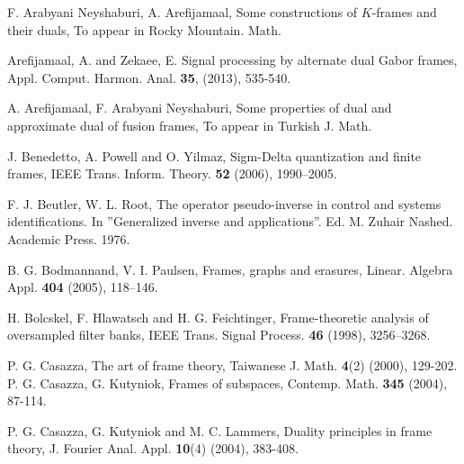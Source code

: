 \documentclass{birkjour}
\theoremstyle{definition}
\theoremstyle{remark}
\numberwithin{equation}{section}
\begin{document}






\begin{thebibliography}{10}


 F. Arabyani Neyshaburi, A. Arefijamaal, Some constructions of $K$-frames and their duals, To appear in Rocky Mountain. Math.





Arefijamaal, A. and   Zekaee, E. Signal processing by alternate dual Gabor
frames, Appl. Comput. Harmon. Anal. {\bf 35}, (2013), 535-540.

 A. Arefijamaal, F. Arabyani Neyshaburi, Some properties of  dual and approximate dual of fusion frames, To appear in Turkish J. Math.

 J. Benedetto, A.  Powell  and  O. Yilmaz,   Sigm-Delta quantization and finite frames,  IEEE Trans. Inform. Theory. \textbf{52} (2006), 1990--2005.

 F. J. Beutler, W. L. Root, The operator pseudo-inverse in control and systems identifications. In ''Generalized inverse and applications''. Ed. M. Zuhair Nashed. Academic Press. 1976.


  B. G. Bodmannand,  V. I. Paulsen,  Frames, graphs and erasures,
Linear. Algebra  Appl. {\bf 404} (2005), 118--146.

  H. Bolcskel, F.  Hlawatsch  and H. G.  Feichtinger,  Frame-theoretic analysis of oversampled filter banks, IEEE Trans. Signal Process. \textbf{46} (1998), 3256--3268.








 P. G. Casazza, The art of frame theory, Taiwanese J. Math. {\bf 4}(2) (2000), 129-202.
 P. G. Casazza, G. Kutyniok, Frames of subspaces,
Contemp. Math. \textbf{345} (2004), 87-114.

 P. G. Casazza, G. Kutyniok and M. C. Lammers, Duality principles in frame theory,
J. Fourier Anal. Appl. \textbf{10}(4) (2004), 383-408.



\end{thebibliography}
\end{document}
